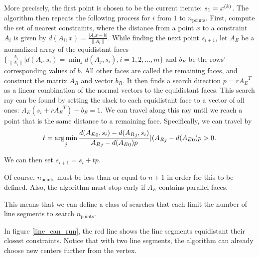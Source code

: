More precisely, the first point is chosen to be the current iterate: $s_1 = x^{(k)}$.
The algorithm then repeats the following process for $i$ from $1$ to $n_{\text{points}}$.
First, compute the set of nearest constraints, where the distance from a point $x$ to a constraint $A_i$ is given by $d(A_i, x) = \frac {|A_i x - b|}{\|A_i\|}$.
While finding the next point $s_{i+1}$, let  $A_E$ be a normalized array of the equidistant faces $\{\frac{A_i}{\|A_i\|} | d(A_i, s_i) = \min_j d(A_j, s_i), i = 1, 2, \ldots, m\}$ and $b_E$ be the rows' corresponding values of $b$.
All other faces are called the remaining faces, and construct the matrix $A_R$ and vector $b_R$.
It then finds a search direction $p  = r{A_E}^T$ as a linear combination of the normal vectors to the equidistant faces.
This search ray can be found by setting the slack to each equidistant face to a vector of all ones: $A_E(s_i + r{A_E}^T) - b_E = 1$.
We can travel along this ray until we reach a point that is the same distance to a remaining face.
Specifically, we can travel by 
\begin{align}
t = \operatorname*{arg\,min}_j {\frac{d({A_E}_0, s_i) - d({A_R}_j, s_i)}{ {A_R}_j - d({A_E}_0) p} | ({A_R}_j - d({A_E}_0) p > 0 }. 
\end{align}

We can then set $s_{i+1} = s_{i} + t p$.

Of course, $n_{\text{points}}$ must be less than or equal to $n + 1$ in order for this to be defined.
Also, the algorithm must stop early if $A_E$ contains parallel faces.



This means that we can define a class of searches that each limit the number of line segments to search $n_{\text{points}}$.

In figure \cref{line_can_run}, the red line shows the line segments equidistant their closest constraints.
Notice that with two line segments, the algorithm can already choose new centers further from the vertex.

